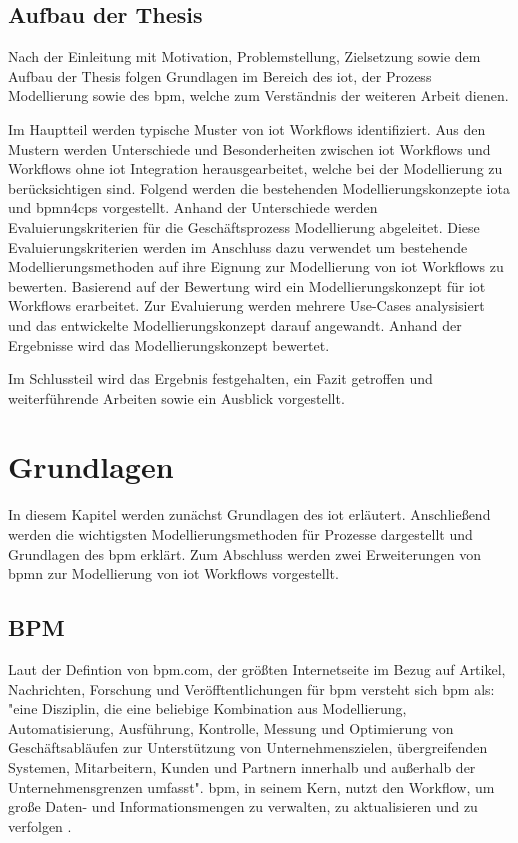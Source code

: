 \documentclass[a4paper, 12pt, twoside, headsepline=true]{scrartcl} %
\begin{document}
\subsection{Aufbau der Thesis}
Nach der Einleitung mit Motivation, Problemstellung, Zielsetzung sowie dem Aufbau der Thesis folgen Grundlagen im Bereich des \ac{iot}, der Prozess Modellierung sowie des \ac{bpm}, welche zum Verständnis der weiteren Arbeit dienen.
 
 Im Hauptteil werden typische Muster von \ac{iot} Workflows identifiziert. Aus den Mustern werden Unterschiede und Besonderheiten zwischen \ac{iot} Workflows und Workflows ohne \ac{iot} Integration herausgearbeitet, welche bei der Modellierung zu berücksichtigen sind. Folgend werden die bestehenden Modellierungskonzepte \ac{iota} und \ac{bpmn4cps} vorgestellt.
 Anhand der Unterschiede werden Evaluierungskriterien für die Geschäftsprozess Modellierung abgeleitet. Diese Evaluierungskriterien werden im Anschluss dazu verwendet um bestehende Modellierungsmethoden auf ihre Eignung zur Modellierung von \ac{iot} Workflows zu bewerten. Basierend auf der Bewertung wird ein Modellierungskonzept für \ac{iot} Workflows erarbeitet. Zur Evaluierung werden mehrere Use-Cases analysisiert und das entwickelte Modellierungskonzept darauf angewandt. Anhand der Ergebnisse wird das Modellierungskonzept bewertet.
 
Im Schlussteil wird das Ergebnis festgehalten, ein Fazit getroffen und weiterführende Arbeiten sowie ein Ausblick vorgestellt.
 
\newpage

\section{Grundlagen}
In diesem Kapitel werden zunächst Grundlagen des \ac{iot} erläutert. Anschließend werden die wichtigsten Modellierungsmethoden für Prozesse dargestellt und Grundlagen des \ac{bpm} erklärt. Zum Abschluss werden zwei Erweiterungen von \ac{bpmn} zur Modellierung von \ac{iot} Workflows vorgestellt.

\subsection{BPM}
Laut der Defintion von bpm.com, der größten Internetseite im Bezug auf Artikel, Nachrichten, Forschung und Veröfftentlichungen für \ac{bpm} \cite{aboutbpmcom} versteht sich \ac{bpm} als: "eine Disziplin, die eine beliebige Kombination aus Modellierung, Automatisierung, Ausführung, Kontrolle, Messung und Optimierung von Geschäftsabläufen zur Unterstützung von Unternehmenszielen, übergreifenden Systemen, Mitarbeitern, Kunden und Partnern innerhalb und außerhalb der Unternehmensgrenzen umfasst"\cite{whatisbpm}. \ac{bpm}, in seinem Kern, nutzt den Workflow, um große Daten- und Informationsmengen zu verwalten, zu aktualisieren und zu verfolgen \cite{bpmofthings}. \\
\end{document}
